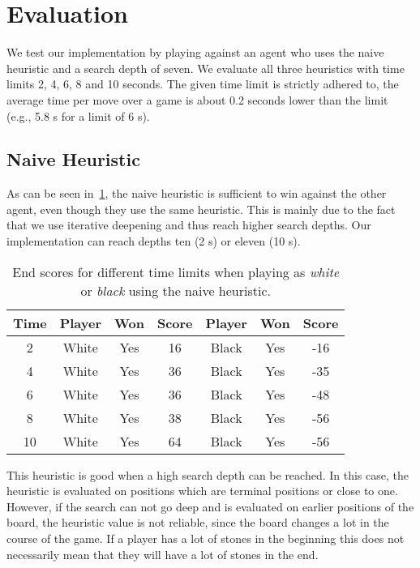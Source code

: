 \section{Evaluation}
\label{sec:evaluation}

We test our implementation by playing against an agent who uses the naive heuristic and a search depth of seven.
We evaluate all three heuristics with time limits 2, 4, 6, 8 and 10 seconds.
The given time limit is strictly adhered to, the average time per move over a game is about 0.2 seconds lower than the limit (e.g., 5.8 s for a limit of 6 s).

\subsection{Naive Heuristic}

As can be seen in~\cref{tab:naive}, the naive heuristic is sufficient to win against the other agent, even though they use the same heuristic.
This is mainly due to the fact that we use iterative deepening and thus reach higher search depths.
Our implementation can reach depths ten (2 s) or eleven (10 s).

\begin{table}[!ht]
\centering
\begin{tabular}{ |c||c|c|c||c|c|c| } 
 \hline
 Time & Player & Won & Score & Player & Won & Score \\ \hline \hline
  2 & White & Yes & 16 & Black & Yes & -16 \\ 
  4 & White & Yes & 36 & Black & Yes & -35 \\  
  6 & White & Yes & 36 & Black & Yes & -48 \\  
  8 & White & Yes & 38 & Black & Yes & -56 \\   
 10 & White & Yes & 64 & Black & Yes & -56 \\ 
 \hline
\end{tabular}
\caption{\label{tab:naive} End scores for different time limits when playing as \textit{white} or \textit{black} using the naive heuristic.}
\end{table}

This heuristic is good when a high search depth can be reached.
In this case, the heuristic is evaluated on positions which are terminal positions or close to one.
However, if the search can not go deep and is evaluated on earlier positions of the board, the heuristic value is not reliable, since the board changes a lot in the course of the game.
If a player has a lot of stones in the beginning this does not necessarily mean that they will have a lot of stones in the end.


